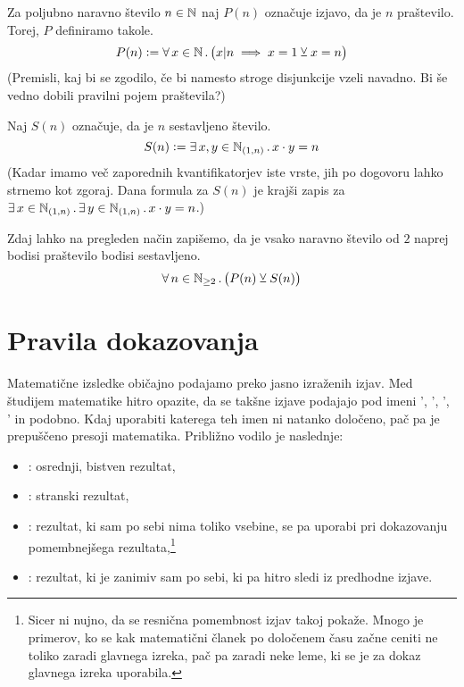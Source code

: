 		\begin{zgled}
			Za poljubno naravno število $n \in \mathbb{N}$ naj $P(n)$ označuje izjavo, da je $n$ praštevilo. Torej, $P$ definiramo takole.
			\[P(n) \dfeq \all[1]{x}[\NN]{x | n \implies x = 1 \xor x = n}\]
			(Premisli, kaj bi se zgodilo, če bi namesto stroge disjunkcije vzeli navadno. Bi še vedno dobili pravilni pojem praštevila?)
			
			Naj $S(n)$ označuje, da je $n$ sestavljeno število.
			\[S(n) \dfeq \xsome{x, y}[\intoo[\NN]{1}{n}]{x \cdot y = n}\]
			(Kadar imamo več zaporednih kvantifikatorjev iste vrste, jih po dogovoru lahko strnemo kot zgoraj. Dana formula za $S(n)$ je krajši zapis za $\xsome{x}[\intoo[\NN]{1}{n}]{\xsome{y}[\intoo[\NN]{1}{n}]{x \cdot y = n}}$.)
			
			Zdaj lahko na pregleden način zapišemo, da je vsako naravno število od $2$ naprej bodisi praštevilo bodisi sestavljeno.
			\[\all[1]{n}[\NN_{\geq 2}]{P(n) \xor S(n)}\]
		\end{zgled}
		
	
	
	\section{Pravila dokazovanja}\label{RAZDELEK: Pravila dokazovanja}
	
		Matematične izsledke običajno podajamo preko jasno izraženih izjav. Med študijem matematike hitro opazite, da se takšne izjave podajajo pod imeni ', ', ', ' in podobno. Kdaj uporabiti katerega teh imen ni natanko določeno, pač pa je prepuščeno presoji matematika. Približno vodilo je naslednje:
		\begin{itemize}
			\item
				: osrednji, bistven rezultat,
			\item
				: stranski rezultat,
			\item
				: rezultat, ki sam po sebi nima toliko vsebine, se pa uporabi pri dokazovanju pomembnejšega rezultata,\footnote{Sicer ni nujno, da se resnična pomembnost izjav takoj pokaže. Mnogo je primerov, ko se kak matematični članek po določenem času začne ceniti ne toliko zaradi glavnega izreka, pač pa zaradi neke leme, ki se je za dokaz glavnega izreka uporabila.}
			\item
				: rezultat, ki je zanimiv sam po sebi, ki pa hitro sledi iz predhodne izjave.
		\end{itemize}
		
